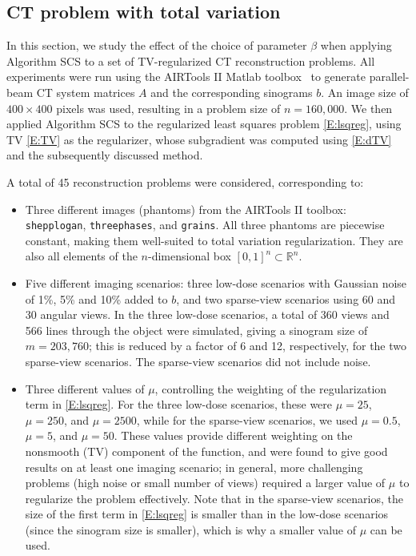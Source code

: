 \documentclass[]{interact}
\newcommand{\Real}{\mathbb{R}}
\theoremstyle{plain}%
\theoremstyle{definition}
\theoremstyle{remark}
\begin{document}
\subsection{CT problem with total variation}
\label{sec:5.2}

In this section, we study the effect of the choice of parameter $\beta$ when applying Algorithm SCS to a set of TV-regularized CT reconstruction problems. All experiments were run using the AIRTools II Matlab toolbox~\cite{HJ18} to generate parallel-beam CT system matrices $A$ and the corresponding sinograms $b$. An image size of $400 \times 400$ pixels was used, resulting in a problem size of $n = 160,000$. We then applied Algorithm SCS to the regularized least squares problem \eqref{E:lsqreg}, using TV \eqref{E:TV} as the regularizer, whose subgradient was computed using \eqref{E:dTV} and the subsequently discussed method.

A total of 45 reconstruction problems were considered, corresponding to:
\begin{itemize}
\item Three different images (phantoms) from the AIRTools II toolbox: {\tt shepplogan}, {\tt threephases}, and {\tt grains}. All three phantoms are piecewise constant, making them well-suited to total variation regularization. They are also all elements of the $n$-dimensional box $[0,1]^n \subset \Real^n$.
\item Five different imaging scenarios: three low-dose scenarios with Gaussian noise of 1\%, 5\% and 10\% added to $b$, and two sparse-view scenarios using  60 and 30 angular views. In the three low-dose scenarios, a total of 360 views and 566 lines through the object were simulated, giving a sinogram size of $m = 203,760$; this is reduced by a factor of 6 and 12, respectively, for the two sparse-view scenarios. The sparse-view scenarios did not include noise.
\item Three different values of $\mu$, controlling the weighting of the regularization term in \eqref{E:lsqreg}. For the three low-dose scenarios, these were $\mu = 25$, $\mu = 250$, and $\mu = 2500$, while for the sparse-view scenarios, we used $\mu = 0.5$, $\mu = 5$, and $\mu = 50$. These values provide different weighting on the nonsmooth (TV) component of the function, and were found to give good results on at least one imaging scenario; in general, more challenging problems (high noise or small number of views) required a larger value of $\mu$ to regularize the problem effectively. Note that in the sparse-view scenarios, the size of the first term in \eqref{E:lsqreg} is smaller than in the low-dose scenarios (since the sinogram size is smaller), which is why a smaller value of $\mu$ can be used.
\end{itemize}
\end{document}
